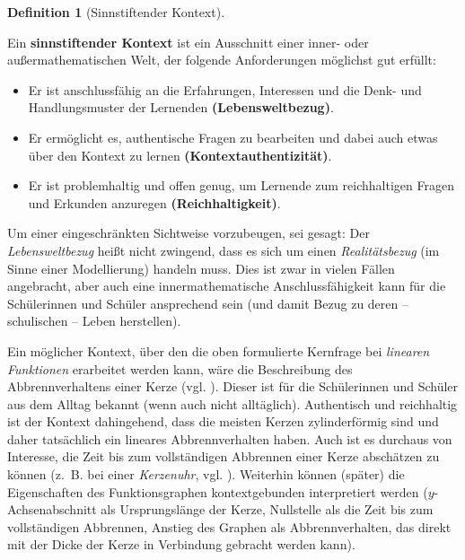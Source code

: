 \documentclass[
]{scrbook}
\providecommand{\tightlist}{%
  \setlength{\itemsep}{0pt}\setlength{\parskip}{0pt}}
\theoremstyle{definition}
\newtheorem{definition}{Definition}[chapter]
\theoremstyle{definition}
\theoremstyle{definition}
\theoremstyle{definition}
\theoremstyle{remark}
\begin{document}
\begin{definition}[Sinnstiftender Kontext]
\protect\hypertarget{def:Kontext}{}\label{def:Kontext}

Ein \textbf{sinnstiftender Kontext} ist ein Ausschnitt einer inner- oder außermathematischen Welt, der folgende Anforderungen möglichst gut erfüllt:

\begin{itemize}
\tightlist
\item
  Er ist anschlussfähig an die Erfahrungen, Interessen und die Denk- und Handlungsmuster der Lernenden \textbf{(Lebensweltbezug)}.
\item
  Er ermöglicht es, authentische Fragen zu bearbeiten und dabei auch etwas über den Kontext zu lernen \textbf{(Kontextauthentizität)}.
\item
  Er ist problemhaltig und offen genug, um Lernende zum reichhaltigen Fragen und Erkunden anzuregen \textbf{(Reichhaltigkeit)}.
\end{itemize}

\end{definition}

Um einer eingeschränkten Sichtweise vorzubeugen, sei gesagt: Der \emph{Lebensweltbezug} heißt nicht zwingend, dass es sich um einen \emph{Realitätsbezug} (im Sinne einer Modellierung) handeln muss. Dies ist zwar in vielen Fällen angebracht, aber auch eine innermathematische Anschlussfähigkeit kann für die Schülerinnen und Schüler ansprechend sein (und damit Bezug zu deren -- schulischen -- Leben herstellen).

Ein möglicher Kontext, über den die oben formulierte Kernfrage bei \emph{linearen Funktionen} erarbeitet werden kann, wäre die Beschreibung des Abbrennverhaltens einer Kerze (vgl. ). Dieser ist für die Schülerinnen und Schüler aus dem Alltag bekannt (wenn auch nicht alltäglich). Authentisch und reichhaltig ist der Kontext dahingehend, dass die meisten Kerzen zylinderförmig sind und daher tatsächlich ein lineares Abbrennverhalten haben. Auch ist es durchaus von Interesse, die Zeit bis zum vollständigen Abbrennen einer Kerze abschätzen zu können (z.~B. bei einer \emph{Kerzenuhr}, vgl. ). Weiterhin können (später) die Eigenschaften des Funktionsgraphen kontextgebunden interpretiert werden (\(y\)-Achsenabschnitt als Ursprungslänge der Kerze, Nullstelle als die Zeit bis zum vollständigen Abbrennen, Anstieg des Graphen als Abbrennverhalten, das direkt mit der Dicke der Kerze in Verbindung gebracht werden kann).
\end{document}
